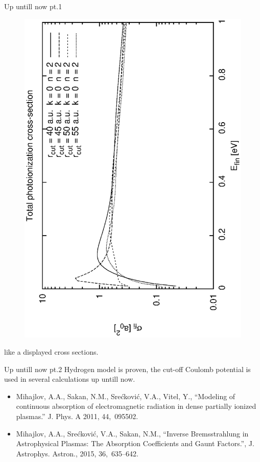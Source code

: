 \documentclass{beamer}
\begin{document}
\begin{frame}{Up untill now pt.1}
\begin{figure}
        \includegraphics[scale=0.25,angle=-90]{fig/preseci_4_U0.eps}
    \end{figure}

like a displayed cross sections.
\end{frame}

\begin{frame}{Up untill now pt.2}
    Hydrogen model is proven, the cut-off Coulomb potential is used in several calculations up untill now.
    
    \begin{itemize}
     \item Mihajlov, A.A., Sakan, N.M., Sre{\'c}kovi{\'c}, V.A., {Vitel}, Y., ``Modeling of continuous absorption of electromagnetic radiation in dense partially ionized plasmas.'' J. Phys. A 2011, 44,~095502.
     
     \item {Mihajlov}, A.A., {Sre{\'c}kovi{\'c}}, V.A., {Sakan}, N.M., ``Inverse Bremsstrahlung in Astrophysical Plasmas: The Absorption Coefficients and Gaunt Factors.'', J. Astrophys. Astron., 2015, 36,~635--642.
    \end{itemize}
\end{frame}
    
\end{document}

